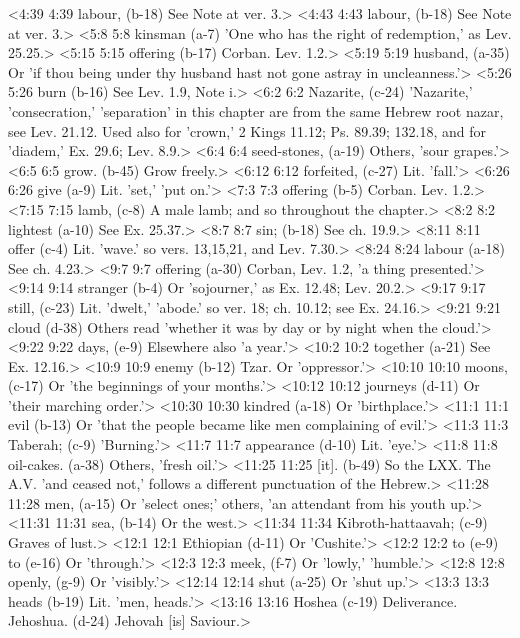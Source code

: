 <4:39 4:39  labour, (b-18) See Note at ver. 3.>
<4:43 4:43  labour, (b-18)  See Note at ver. 3.>
<5:8 5:8  kinsman (a-7)  'One who has the right of redemption,' as Lev. 25.25.>
<5:15 5:15  offering (b-17)  Corban. Lev. 1.2.>
<5:19 5:19  husband, (a-35)  Or 'if thou being under thy husband hast not gone astray in  uncleanness.'>
<5:26 5:26  burn (b-16)  See Lev. 1.9, Note i.>
<6:2 6:2  Nazarite, (c-24)  'Nazarite,' 'consecration,' 'separation' in this chapter are  from the same Hebrew root nazar, see Lev. 21.12. Used also  for 'crown,' 2 Kings 11.12; Ps. 89.39; 132.18, and for  'diadem,' Ex. 29.6; Lev. 8.9.>
<6:4 6:4  seed-stones, (a-19)  Others, 'sour grapes.'>
<6:5 6:5  grow. (b-45)  Grow freely.>
<6:12 6:12  forfeited, (c-27)  Lit. 'fall.'>
<6:26 6:26  give (a-9)  Lit. 'set,' 'put on.'>
<7:3 7:3  offering (b-5)  Corban. Lev. 1.2.>
<7:15 7:15  lamb, (c-8)  A male lamb; and so throughout the chapter.>
<8:2 8:2  lightest (a-10)  See Ex. 25.37.>
<8:7 8:7  sin; (b-18)  See ch. 19.9.>
<8:11 8:11  offer (c-4)  Lit. 'wave.' so vers. 13,15,21, and Lev. 7.30.>
<8:24 8:24  labour (a-18)  See ch. 4.23.>
<9:7 9:7  offering (a-30)  Corban, Lev. 1.2, 'a thing presented.'>
<9:14 9:14  stranger (b-4)  Or 'sojourner,' as Ex. 12.48; Lev. 20.2.>
<9:17 9:17  still, (c-23)  Lit. 'dwelt,' 'abode.' so ver. 18; ch. 10.12; see Ex. 24.16.>
<9:21 9:21  cloud (d-38)  Others read 'whether it was by day or by night when the  cloud.'>
<9:22 9:22  days, (e-9)  Elsewhere also 'a year.'>
<10:2 10:2  together (a-21)  See Ex. 12.16.>
<10:9 10:9  enemy (b-12)  Tzar. Or 'oppressor.'>
<10:10 10:10  moons, (c-17)  Or 'the beginnings of your months.'>
<10:12 10:12  journeys (d-11)  Or 'their marching order.'>
<10:30 10:30  kindred (a-18)  Or 'birthplace.'>
<11:1 11:1  evil (b-13)  Or 'that the people became like men complaining of evil.'>
<11:3 11:3  Taberah; (c-9)  'Burning.'>
<11:7 11:7  appearance (d-10)  Lit. 'eye.'>
<11:8 11:8  oil-cakes. (a-38)  Others, 'fresh oil.'>
<11:25 11:25  [it]. (b-49)  So the LXX. The A.V. 'and ceased not,' follows a different  punctuation of the Hebrew.>
<11:28 11:28  men, (a-15)  Or 'select ones;' others, 'an attendant from his youth up.'>
<11:31 11:31  sea, (b-14)  Or the west.>
<11:34 11:34  Kibroth-hattaavah; (c-9)  Graves of lust.>
<12:1 12:1  Ethiopian (d-11)  Or 'Cushite.'>
<12:2 12:2  to (e-9)  to (e-16)
  Or 'through.'>
<12:3 12:3  meek, (f-7)  Or 'lowly,' 'humble.'>
<12:8 12:8  openly, (g-9)  Or 'visibly.'>
<12:14 12:14  shut (a-25)  Or 'shut up.'>
<13:3 13:3  heads (b-19)  Lit. 'men, heads.'>
<13:16 13:16  Hoshea (c-19)  Deliverance.
  Jehoshua. (d-24)  Jehovah [is] Saviour.>
